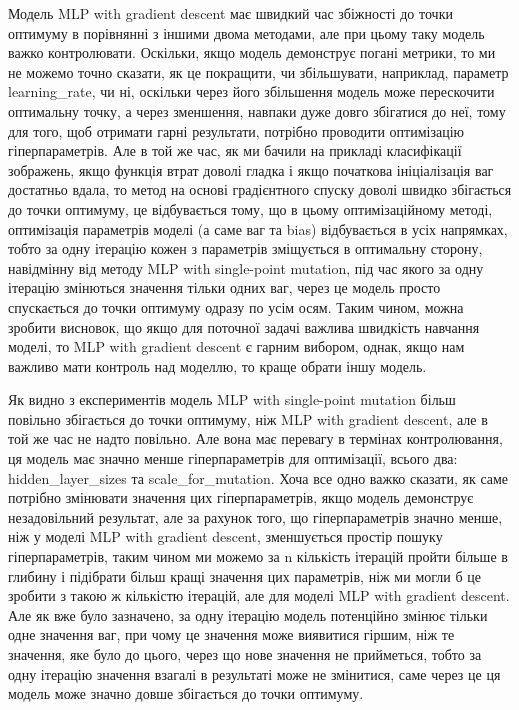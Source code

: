 Модель MLP with gradient descent має швидкий час збіжності до точки оптимуму в порівнянні з іншими двома методами, але при цьому таку модель важко контролювати. Оскільки, якщо модель демонструє погані метрики, то ми не можемо точно сказати, як це покращити, чи збільшувати, наприклад, параметр learning\_rate, чи ні, оскільки через його збільшення модель може перескочити оптимальну точку, а через зменшення, навпаки дуже довго збігатися до неї, тому для того, щоб отримати гарні результати, потрібно проводити оптимізацію гіперпараметрів. Але в той же час, як ми бачили на прикладі класифікації зображень, якщо функція втрат доволі гладка і якщо початкова ініціалізація ваг достатньо вдала, то метод на основі градієнтного спуску доволі швидко збігається до точки оптимуму, це відбувається тому, що в цьому оптимізаційному методі, оптимізація параметрів моделі (а саме ваг та bias) відбувається в усіх напрямках, тобто за одну ітерацію кожен з параметрів зміщується в оптимальну сторону, навідмінну від методу MLP with single-point mutation, під час якого за одну ітерацію змінються значення тільки одних ваг, через це модель просто спускається до точки оптимуму одразу по усім осям. Таким чином, можна зробити висновок, що якщо для поточної задачі важлива швидкість навчання моделі, то MLP with gradient descent є гарним вибором, однак, якщо нам важливо мати контроль над моделлю, то краще обрати іншу модель.

Як видно з експериментів модель MLP with single-point mutation більш повільно збігається до точки оптимуму, ніж MLP with gradient descent, але в той же час не надто повільно. Але вона має перевагу в термінах контролювання, ця модель має значно менше гіперпараметрів для оптимізації, всього два: hidden\_layer\_sizes та scale\_for\_mutation. Хоча все одно важко сказати, як саме потрібно змінювати значення цих гіперпараметрів, якщо модель демонструє незадовільний результат, але за рахунок того, що гіперпараметрів значно менше, ніж у моделі MLP with gradient descent, зменшується простір пошуку гіперпараметрів, таким чином ми можемо за n кількість ітерацій пройти більше в глибину і підібрати більш кращі значення цих параметрів, ніж ми могли б це зробити з такою ж кількістю ітерацій, але для моделі MLP with gradient descent. Але як вже було зазначено, за одну ітерацію модель потенційно змінює тільки одне значення ваг, при чому це значення може виявитися гіршим, ніж те значення, яке було до цього, через що нове значення не прийметься, тобто за одну ітерацію значення взагалі в результаті може не змінитися, саме через це ця модель може значно довше збігається до точки оптимуму.

